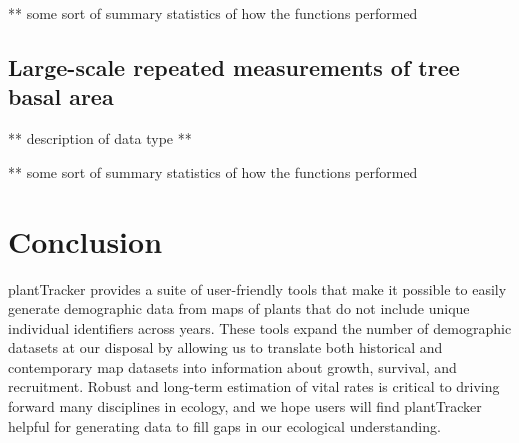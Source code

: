 \documentclass[12pt, letterpaper]{article}
\begin{document}
** some sort of summary statistics of how the functions performed

\subsection{Large-scale repeated measurements of tree basal area}
** description of data type **

** some sort of summary statistics of how the functions performed

\section{Conclusion}
plantTracker provides a suite of user-friendly tools that make it possible to easily generate demographic data from maps of plants that do not include unique individual identifiers across years. These tools expand the number of demographic datasets at our disposal by allowing us to translate both historical and contemporary map datasets into information about growth, survival, and recruitment. Robust and long-term estimation of vital rates is critical to driving forward many disciplines in ecology, and we hope users will find plantTracker helpful for generating data to fill gaps in our ecological understanding.  


\end{document}
